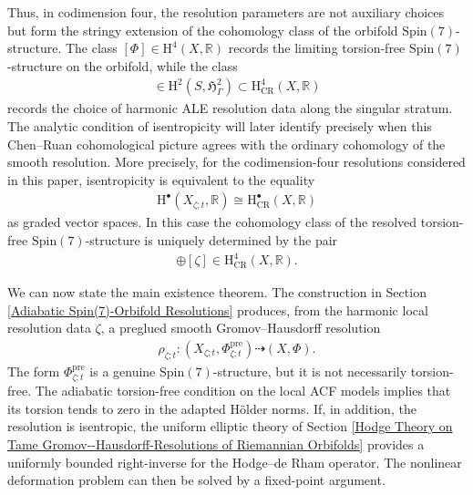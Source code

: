 \documentclass[psamsfonts]{amsart}
\theoremstyle{plain}
\theoremstyle{definition}{
\newtheorem{defi}{Definition}[section]
\newtheorem{ass}{Assumption}
\newtheorem*{nota}{Notation}}
\theoremstyle{remark}{
\newtheorem{rem}{Remark}
\newtheorem{ex}{Example}}
\theoremstyle{plain}{
\newtheorem{thm}{Theorem}[section]
\newtheorem{lem}{Lemma}[section]
\newtheorem{cor}{Corollary}[section]
\newtheorem{prop}{Proposition}[section]
\newtheorem{con}{Conjecture}[section]}
\newcommand{\m}[1]{{\mathrm{#1}}}
\begin{document}
Thus, in codimension four, the resolution parameters are not auxiliary choices but form the stringy extension of the cohomology class of the orbifold $\m{Spin}(7)$-structure. The class $[\Phi]\in \m{H}^4(X,\mathbb{R})$ records the limiting torsion-free $\m{Spin}(7)$-structure on the orbifold, while the class
\begin{align*}
    [\zeta]\in \m{H}^2(S,\mathfrak{H}^2_\Gamma)\subset \m{H}^4_{\m{CR}}(X,\mathbb{R})
\end{align*}
records the choice of harmonic ALE resolution data along the singular stratum. The analytic condition of isentropicity will later identify precisely when this Chen--Ruan cohomological picture agrees with the ordinary cohomology of the smooth resolution. More precisely, for the codimension-four resolutions considered in this paper, isentropicity is equivalent to the equality
\begin{align*}
    \m{H}^\bullet(X_{\zeta;t},\mathbb{R})\cong \m{H}^\bullet_{\m{CR}}(X,\mathbb{R})
\end{align*}
as graded vector spaces. In this case the cohomology class of the resolved torsion-free $\m{Spin}(7)$-structure is uniquely determined by the pair
\begin{align*}
    [\Phi]\oplus[\zeta]\in \m{H}^4_{\m{CR}}(X,\mathbb{R}).
\end{align*}

We can now state the main existence theorem. The construction in Section \ref{Adiabatic Spin(7)-Orbifold Resolutions} produces, from the harmonic local resolution data $\zeta$, a preglued smooth Gromov--Hausdorff resolution
\begin{align*}
    \rho_{\zeta;t}\colon (X_{\zeta;t},\Phi^{\m{pre}}_{\zeta;t})\dashrightarrow (X,\Phi).
\end{align*}
The form $\Phi^{\m{pre}}_{\zeta;t}$ is a genuine $\m{Spin}(7)$-structure, but it is not necessarily torsion-free. The adiabatic torsion-free condition on the local ACF models implies that its torsion tends to zero in the adapted Hölder norms. If, in addition, the resolution is isentropic, the uniform elliptic theory of Section \ref{Hodge Theory on Tame Gromov--Hausdorff-Resolutions of Riemannian Orbifolds} provides a uniformly bounded right-inverse for the Hodge--de Rham operator. The nonlinear deformation problem can then be solved by a fixed-point argument.
\end{document}
